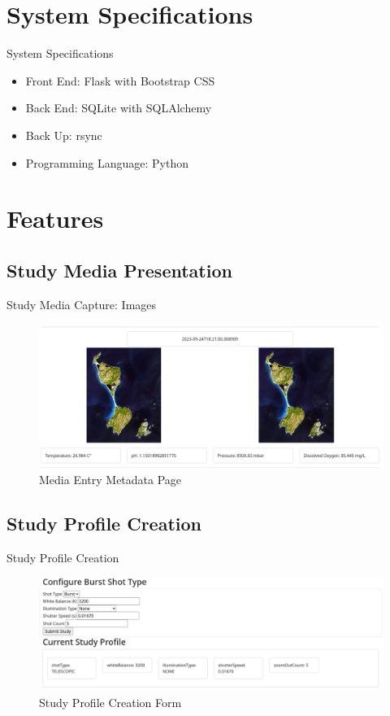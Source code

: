 \documentclass[17pt, aspectratio=169]{beamer}
\begin{document}
\section{System Specifications}
\begin{frame}{System Specifications}
	\begin{itemize}
		\item Front End: Flask with Bootstrap CSS
		\item Back End: SQLite with SQLAlchemy
		\item Back Up: rsync
		\item Programming Language: Python
	\end{itemize}
\end{frame}
\section{Features}
\subsection{Study Media Presentation}
\begin{frame}{Study Media Capture: Images}
	\begin{figure}
		\includegraphics[height=0.65\textheight]{./Figures/study_media_capture_images.png}
		\caption{Media Entry Metadata Page}
	\end{figure}
\end{frame}
\subsection{Study Profile Creation}
\begin{frame}{Study Profile Creation}
	\begin{figure}
		\includegraphics[height=0.60\textheight]{./Figures/study_profile_creation.png}
		\caption{Study Profile Creation Form}
	\end{figure}
\end{frame}
\end{document}

